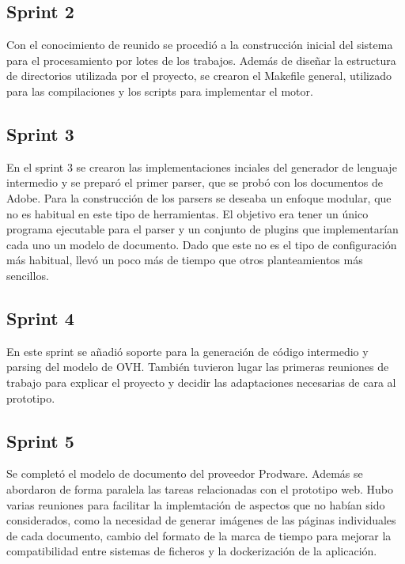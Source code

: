 \subsection{Sprint 2}

Con el conocimiento de reunido se procedió a la construcción inicial del sistema para el procesamiento por lotes de los trabajos. Además de diseñar la estructura de directorios utilizada por el proyecto, se crearon el Makefile general, utilizado para las compilaciones y los scripts para implementar el motor.

\subsection{Sprint 3}

En el sprint 3 se crearon las implementaciones inciales del generador de lenguaje intermedio y se preparó el primer parser, que se probó con los documentos de Adobe. Para la construcción de los parsers se deseaba un enfoque modular, que no es habitual en este tipo de herramientas. El objetivo era tener un único programa ejecutable para el parser y un conjunto de plugins que implementarían cada uno un modelo de documento. Dado que este no es el tipo de configuración más habitual, llevó un poco más de tiempo que otros planteamientos más sencillos.

\subsection{Sprint 4}

En este sprint se añadió soporte para la generación de código intermedio y parsing del modelo de OVH. También tuvieron lugar las primeras reuniones de trabajo para explicar el proyecto y decidir las adaptaciones necesarias de cara al prototipo.

\subsection{Sprint 5}

Se completó el modelo de documento del proveedor Prodware. Además se abordaron de forma paralela las tareas relacionadas con el prototipo web. Hubo varias reuniones para facilitar la implemtación de aspectos que no habían sido considerados, como  la necesidad de generar imágenes de las páginas individuales de cada documento, cambio del formato de la marca de tiempo para mejorar la compatibilidad entre sistemas de ficheros y la dockerización de la aplicación.

